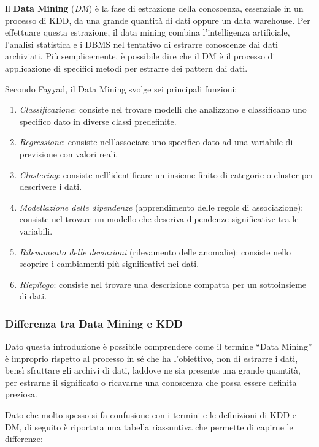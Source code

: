 Il \textbf{Data Mining} (\textit{DM}) è la fase di estrazione della conoscenza, essenziale in un processo di KDD, da una grande quantità di dati oppure un data warehouse. Per effettuare questa estrazione, il data mining combina l'intelligenza artificiale, l'analisi statistica e i DBMS nel tentativo di estrarre conoscenze dai dati archiviati. Più semplicemente, è possibile dire che il DM è il processo di applicazione di specifici metodi per estrarre dei pattern dai dati.\cite{citeseerx_data_mining}

Secondo Fayyad, il Data Mining svolge sei principali funzioni:\cite{aircconline_data_mining}

\begin{enumerate}
    \item \textit{Classificazione}: consiste nel trovare modelli che analizzano e classificano uno specifico dato in diverse classi predefinite.
    \item \textit{Regressione}: consiste nell'associare uno specifico dato ad una variabile di previsione con valori reali.
    \item \textit{Clustering}: consiste nell'identificare un insieme finito di categorie o cluster per descrivere i dati.
    \item \textit{Modellazione delle dipendenze} (apprendimento delle regole di associazione): consiste nel trovare un modello che descriva dipendenze significative tra le variabili.
    \item \textit{Rilevamento delle deviazioni} (rilevamento delle anomalie): consiste nello scoprire i cambiamenti più significativi nei dati.
    \item \textit{Riepilogo}: consiste nel trovare una descrizione compatta per un sottoinsieme di dati.
\end{enumerate}

\subsubsection{Differenza tra Data Mining e KDD}

Dato questa introduzione è possibile comprendere come il termine “Data Mining” è improprio rispetto al processo in sé che ha l'obiettivo, non di estrarre i dati, bensì sfruttare gli archivi di dati, laddove ne sia presente una grande quantità, per estrarne il significato o ricavarne una conoscenza che possa essere definita preziosa.\cite{aws_data_mining}

Dato che molto spesso si fa confusione con i termini e le definizioni di KDD e DM, di seguito è riportata una tabella riassuntiva che permette di capirne le differenze:\cite{geeksforgeeks_data_mining}

